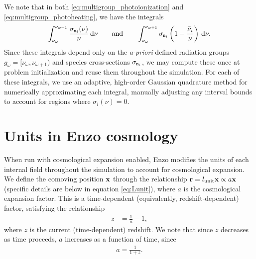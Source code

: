 \documentclass[10pt]{article}
\renewcommand{\(}{\left(}
\renewcommand{\)}{\right)}
\newcommand{\xvec}{{\bf x}}
\newcommand{\rvec}{{\bf r}}
\newcommand{\mn}{{\tt n}}
\newcommand{\Lunit}{l_{\text{unit}}}
\begin{document}
We note that in both \eqref{eq:multigroup_photoionization} and
\eqref{eq:multigroup_photoheating}, we have the integrals 
\begin{align}
  \label{eq:integrals} 
    \int_{\nu_{\omega}}^{\nu_{\omega+1}} \frac{\sigma_{\mn_i}(\nu)}{\nu}\,\mathrm d\nu
    \qquad\text{and}\qquad
    \int_{\nu_{\omega}}^{\nu_{\omega+1}} \sigma_{\mn_i} \left(1 - \frac{\bar{\nu}_i}{\nu}\right)\,\mathrm d\nu.
\end{align}
Since these integrals depend only on the {\em a-priori} defined
radiation groups $g_{\omega}=[\nu_{\omega},\nu_{\omega+1})$ and species cross-sections
$\sigma_{\mn_i}$, we may compute these once at problem initialization
and reuse them throughout the simulation.  For each of these
integrals, we use an adaptive, high-order Gaussian quadrature
method for numerically approximating each integral, manually adjusting
any interval bounds to account for regions where $\sigma_i(\nu)=0$.




\section{Units in Enzo cosmology}
\label{sec:units}

When run with cosmological expansion enabled, Enzo modifies the
units of each internal field throughout the simulation to account for
cosmological expansion.  We define the comoving position $\xvec$
through the relationship $\rvec = \Lunit\xvec \propto a \xvec$
(specific details are below in equation \eqref{eq:Lunit}), where $a$
is the cosmological expansion factor.  This is a time-dependent
(equivalently, redshift-dependent) factor, satisfying the relationship
\begin{align}
  \label{eq:CurrentRedshift}
  z &= \frac{1}{a} - 1,
\end{align}
where $z$ is the current (time-dependent) redshift.  We note that
since $z$ decreases as time proceeds, $a$ increases as a function of
time, since 
\begin{align}
  \label{eq:expansion_factor}
  a = \frac{1}{1+z}.
\end{align}
\end{document}
